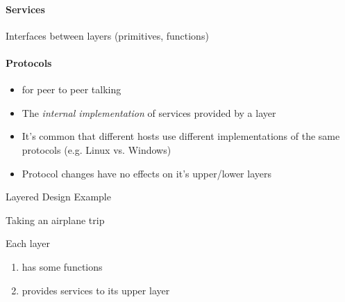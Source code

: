 \paragraph{Services}

Interfaces between layers (primitives, functions)

\paragraph{Protocols}

\begin{itemize}
\item for peer to peer talking
\item The \emph{internal implementation} of services provided by a layer
\item It's common that different hosts use different implementations of the same protocols
  (e.g. Linux vs. Windows)
\item Protocol changes have no effects on it's upper/lower layers
\end{itemize}

\begin{frame}{Layered Design Example}
  \begin{block}{Taking an airplane trip}
    \begin{center}
    \end{center}
    Each layer
    \begin{enumerate}
    \item has some functions
    \item provides services to its upper layer
    \end{enumerate}
  \end{block}
\end{frame}

